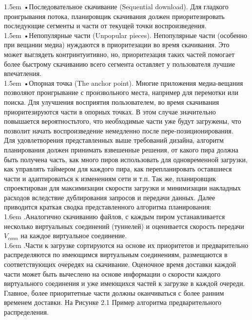 \documentclass[10pt,a4paper]{article}
\begin{document}
\hangindent 1.5em
\noindent   
•\quad Последовательное скачивание (Sequential download). Для гладкого проигрывания потока, планировщик скачивания должен приоритезировать последующие сегменты и части от текущей точки воспроизведения.
\vspace{-0.8em}
\\

\hangindent 1.5em
\noindent   
•\quad Непопулярные части (Unpopular pieces). Непопулярные части (особенно при вещании медиа) нуждаются в приоритезации во время скачивания. Это может выглядеть контринтуитивно, но, приоритезация таких частей помогает более быстрому скачиванию всего сегмента оставляет у пользователя лучшие впечатления.
\vspace{-0.8em}
\\ 

\hangindent 1.5em
\noindent   
•\quad Опорная точка (The anchor point). Многие приложения медиа-вещания позволяют проигрывание с произвольного места, например для перемотки или поиска. Для улучшения восприятия пользователем, во время скачивания приоритезируются части в опорных точках. В этом случае значительно повышается вероятностьтого,  что необходимые части уже будут загружены, что позволит начать воспроизведение немедленно после пере-позиционирования.
\vspace{-0.6em}
\\ 

\noindent   
Для удовлетворения представленных выше требований дизайна, алгоритм планирования должен принимать взвешенные решения, от какого пира должна быть получена часть, как много пиров использовать для одновременной загрузки, как управлять таймером для каждого пира, как перепланировать оставшиеся части и адаптироваться к изменениям сети и т.п. Так же, планировщик спроектирован для максимизации скорости загрузки и минимизации накладных расходов вследствие дублирования запросов и передачи данных. Далее приводится краткая сводка представленного алгоритма планирования:
\vspace{-0.8em}
\\ 

\hangindent 1.6em
.\quad  Аналогично скачиванию файлов, с каждым пиром устанавливается несколько виртуальных соединений (туннелей) и оценивается скорость передачи $V_{conn}$ на каждое виртуальное соединение.
\vspace{-0.8em}
\\ 

\hangindent 1.6em
.\quad Части к загрузке сортируются на основе их приоритетов и предварительно распределяются по имеющимся виртуальным соединениям, размещаются в соответствующих очередях на скачивание. Оценочное время доставки каждой части может быть вычеслено на основе информации о скорости каждого виртуального соединения и уже имеющихся частей к загрузке в каждой очереди. Главное, более приоритетные части должны оканчиваться с более ранним временем доставки. На Рисунке 2.1 Пример алгоритма предварительного распределения.
\vspace{-0.8em}
\\ 
\end{document}
